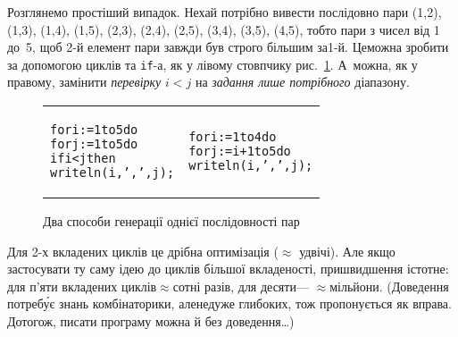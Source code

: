 {

\def\tabbb{\hspace*{1em}}

Розглянемо простіший випадок. Нехай потрібно вивести послідовно пари (1,2), (1,3), (1,4), (1,5), (2,3), (2,4), (2,5), (3,4), (3,5), (4,5), тобто пари з чисел від 1 до~5, щоб \mbox{2-й} елемент пари завжди був строго більшим за\nolinebreak[2] \mbox{1-й}. Це\nolinebreak[3] можна зробити за допомогою циклів та \texttt{if}-а, як у лівому стовпчику рис.~\ref{fig:check-or-gen-only-needed}. А~можна, як у правому, замінити \emph{перевірку} ${i{<}j}$ на \emph{задання лише потрібного} діапазону.

\vspace{-0.5\baselineskip}

\begin{figure}[h]
\begin{center}
\hrulefill\par
\begin{tabular}{l|l}
\begin{minipage}{13em}\begin{small}\renewcommand{\baselinestretch}{0.875}\begin{alltt}for i:=1 to 5 do
\tabbb{}for j:=1 to 5 do
\tabbb\tabbb{}if i < j then
\tabbb\tabbb\tabbb{}writeln(i, ', ', j);\end{alltt}\end{small}\end{minipage}
&
\begin{minipage}{13em}\begin{small}\renewcommand{\baselinestretch}{0.875}\begin{alltt}for i:=1 to 4 do
\tabbb{}for j:=i+1 to 5 do
\tabbb\tabbb{}writeln(i, ', ', j);\end{alltt}\end{small}\end{minipage}
\end{tabular}
\end{center}

\vspace{-0.75\baselineskip}

\caption{Два способи генерації однієї послідовності пар}\label{fig:check-or-gen-only-needed}
\end{figure} %

\vspace{-0.75\baselineskip}

}

Для \mbox{2-х} вкладених циклів це  дрібна оптимізація ($\approx$ удвічі). Але якщо застосувати ту саму ідею до циклів більшої вкладеності, пришвидшення істотне: для п'яти вкладених циклів\nolinebreak[3] $\approx$сотні разів, для десяти\nolinebreak[3] --- $\approx$мільйони. (Доведення потреб\'{у}є знань комбінаторики, але\nolinebreak[1] не\nolinebreak[3] дуже глибоких, тож пропонується як вправа. До\nolinebreak[3] того\nolinebreak[3] ж, писати програму можна й без доведення\dots)

